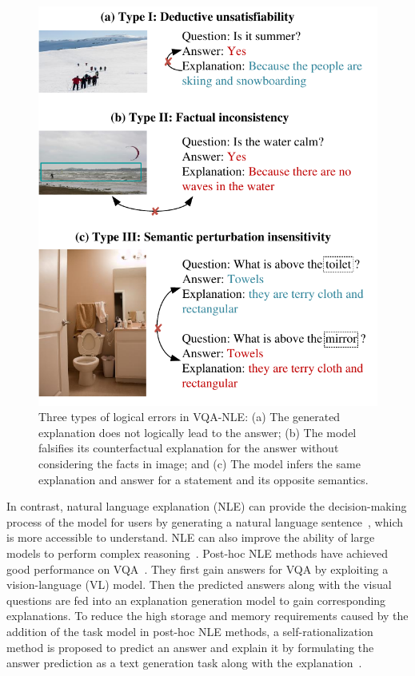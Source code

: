 \documentclass[letterpaper]{article} %
\begin{document}
\begin{figure}[h]
	\centering
	\includegraphics[width=0.99\columnwidth]{example.pdf} %
	\caption{Three types of logical errors in VQA-NLE: (a) The generated explanation does not logically lead to the answer; (b) The model falsifies its counterfactual explanation for the answer without considering the facts in image; and (c) The model infers the same explanation and answer for a statement and its opposite semantics.}
	\label{example}
\end{figure}


In contrast, natural language explanation (NLE) can provide the decision-making process of the model for users by generating a natural language sentence~\cite{camburu2018snli,park2018multimodal}, which is more accessible to understand. NLE can also improve the ability of large models to perform complex reasoning~\cite{wei2022chain}. Post-hoc NLE methods have achieved good performance on VQA~\cite{park2018multimodal,kayser2021vil,wu2019faithful}. They first gain answers for VQA by exploiting a vision-language (VL) model. Then the predicted answers along with the visual questions are fed into an explanation generation model to gain corresponding explanations. To reduce the high storage and memory requirements caused by the addition of the task model in post-hoc NLE methods, a self-rationalization method is proposed to predict an answer and explain it by formulating the answer prediction as a text generation task along with the explanation~\cite{sammani2022nlx}.
\end{document}
